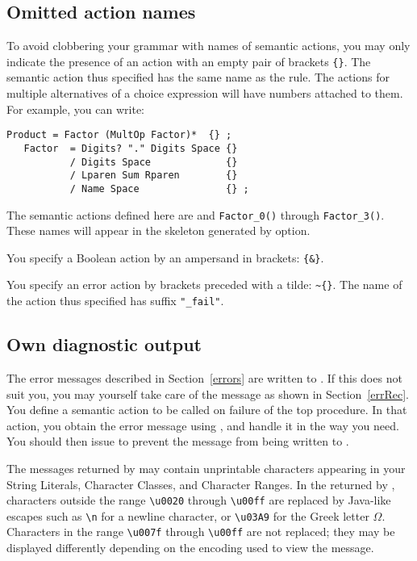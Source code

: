 \subsection{Omitted action names}

To avoid clobbering your grammar with names of semantic actions, 
you may only indicate the presence of an action with an empty pair of brackets \verb#{}#.
The semantic action thus specified has the same name as the rule.
The actions for multiple alternatives of a choice expression will have numbers attached to them.
For example, you can write:

\small
\begin{Verbatim}[frame=single,framesep=2mm,samepage=true,xleftmargin=15mm,xrightmargin=15mm,baselinestretch=0.8]
   Product = Factor (MultOp Factor)*  {} ;
   Factor  = Digits? "." Digits Space {}
           / Digits Space             {}
           / Lparen Sum Rparen        {} 
           / Name Space               {} ; 
\end{Verbatim}
\normalsize

The semantic actions defined here are
 and \verb#Factor_0()# through \verb#Factor_3()#.
These names will appear in the skeleton generated by  option.

You specify a Boolean action by an ampersand in brackets: \verb#{&}#.

You specify an error action by brackets preceded with a tilde: \verb#~{}#.\newline
The name of the action thus specified has suffix \verb#"_fail"#.


\subsection{Own diagnostic output}

The error messages described in Section~\ref{errors}
are written to .
If this does not suit you, you may yourself take care of the message
as shown in Section~\ref{errRec}.
You define a semantic action to be called on failure of the top procedure.
In that action, you obtain the error message using ,
and handle it in the way you need.
You should then issue  to prevent the message from
being written to .

The messages returned by  may contain unprintable
characters appearing in your String Literals, Character Classes, and Character Ranges.
In the  returned by ,
characters outside the range \verb#\u0020# through \verb#\u00ff#
are replaced by Java-like
escapes such as \verb#\n# for a newline character, 
or \verb#\u03A9# for the Greek letter $\Omega$.
Characters in the range \verb#\u007f# through \verb#\u00ff# are not replaced;
they may be displayed differently depending on the encoding used to view the message.

